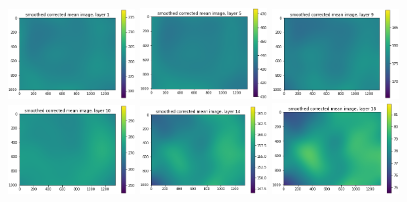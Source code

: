 \documentclass[letterpaper,11pt]{article}
\begin{document}
\begin{figure}[!ht]
\centering
\includegraphics[width=0.3\textwidth]{images/results/smoothed_corrected_mean_image_layers_vectra/smoothed_corrected_mean_image_layer_1_same_scale}
\includegraphics[width=0.3\textwidth]{images/results/smoothed_corrected_mean_image_layers_vectra/smoothed_corrected_mean_image_layer_5_same_scale}
\includegraphics[width=0.3\textwidth]{images/results/smoothed_corrected_mean_image_layers_vectra/smoothed_corrected_mean_image_layer_9_same_scale}
\includegraphics[width=0.3\textwidth]{images/results/smoothed_corrected_mean_image_layers_vectra/smoothed_corrected_mean_image_layer_10_same_scale}
\includegraphics[width=0.3\textwidth]{images/results/smoothed_corrected_mean_image_layers_vectra/smoothed_corrected_mean_image_layer_14_same_scale}
\includegraphics[width=0.3\textwidth]{images/results/smoothed_corrected_mean_image_layers_vectra/smoothed_corrected_mean_image_layer_18_same_scale}

\end{figure}
\end{document}
